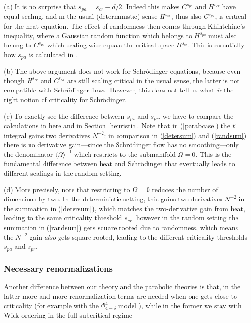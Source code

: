 \documentclass[11 pt,reqno]{amsart}
\theoremstyle{definition}
\theoremstyle{remark}
\numberwithin{equation}{section}
\begin{document}
{(a) It is no surprise that $s_{pa}=s_{cr}-d/2$. Indeed this makes $C^{s_{pa}}$ and $H^{s_{cr}}$ have equal scaling, and in the usual (deterministic) sense $H^{s_{cr}}$, thus also $C^{s_{pa}}$, is critical for the heat equation. The effect of randomness then comes through Khintchine's inequality, where a Gaussian random function which belongs to $H^{s_{pa}}$ must also belong to $C^{s_{pa}}$ which scaling-wise equals the critical space $H^{s_{cr}}$. This is essentially how $s_{pa}$ is calculated in \cite{Hairer}.

(b) The above argument does not work for Schr\"{o}dinger equations, because even though $H^{s_{cr}}$ and $C^{s_{pa}}$ are still scaling critical in the usual sense, the latter is not compatible with Schr\"{o}dinger flows. However, this does not tell us what \emph{is} the right notion of criticality for Schr\"{o}dinger.

(c) To exactly see the difference between $s_{pa}$ and $s_{pr}$, we have to compare the calculations in here and in Section \ref{heuristic}. Note that in (\ref{parabcase}) the $t'$ integral gains two derivatives $N^{-2}$; in comparison in (\ref{detersum}) and (\ref{randsum}) there is no derivative gain---since the Schr\"{o}dinger flow has no smoothing---only the denominator $\langle \Omega\rangle^{-1}$ which restricts to the submanifold $\Omega=0$. This is the fundamental difference between heat and Schr\"{o}dinger that eventually leads to different scalings in the random setting.

(d) More precisely, note that restricting to $\Omega=0$ reduces the number of dimensions by two. In the deterministic setting, this gains two derivatives $N^{-2}$ in the summation in (\ref{detersum}), which matches the two-derivative gain from heat, leading to the same criticality threshold $s_{cr}$; however in the random setting the summation in (\ref{randsum}) gets square rooted due to randomness, which means the $N^{-2}$ gain \emph{also} gets square rooted, leading to the different criticality thresholds $s_{pa}$ and $s_{pr}$.
\subsubsection{Necessary renormalizations} Another difference between our theory and the parabolic theories is that, in the latter more and more renormalization terms are needed when one gets close to criticality (for example with the $\Phi_{4-\delta}^4$ model \cite{BCCH,CMW}), while in the former we stay with Wick ordering in the full subcritical regime.

}
\end{document}
